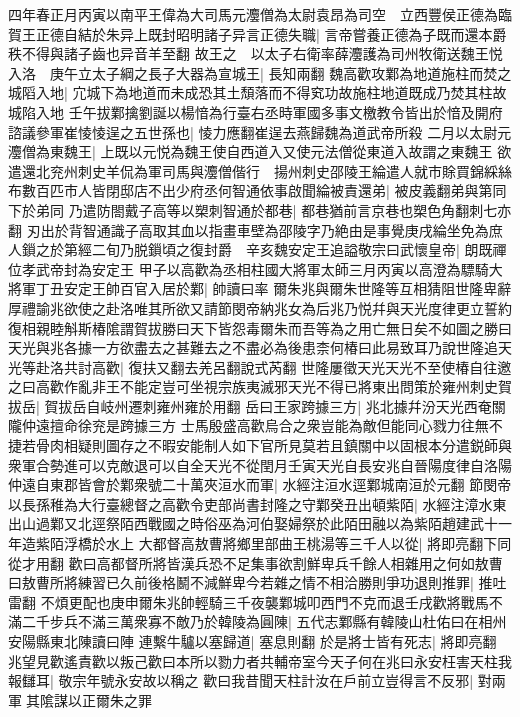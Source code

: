 四年春正月丙寅以南平王偉為大司馬元灋僧為太尉袁昂為司空　立西豐侯正德為臨賀王正德自結於朱异上既封昭明諸子异言正德失職|{
	言帝嘗養正德為子既而還本爵秩不得與諸子齒也异音羊至翻}
故王之　以太子右衛率薛灋護為司州牧衛送魏王悦入洛　庚午立太子綱之長子大器為宣城王|{
	長知兩翻}
魏高歡攻鄴為地道施柱而焚之城䧟入地|{
	宂城下為地道而未成恐其土頹落而不得䆒功故施柱地道既成乃焚其柱故城陷入地}
壬午拔鄴擒劉誕以楊愔為行臺右丞時軍國多事文檄教令皆出於愔及開府諮議參軍崔㥄㥄逞之五世孫也|{
	㥄力應翻崔逞去燕歸魏為道武帝所殺}
二月以太尉元灋僧為東魏王|{
	上既以元悦為魏王使自西道入又使元法僧從東道入故謂之東魏王}
欲遣還北兖州刺史羊侃為軍司馬與灋僧偕行　揚州刺史邵陵王綸遣人就市賖買錦綵絲布數百匹市人皆閉邸店不出少府丞何智通依事啟聞綸被責還弟|{
	被皮義翻弟與第同下於弟同}
乃遣防閤戴子高等以槊刺智通於都巷|{
	都巷猶前言京巷也槊色角翻刺七亦翻}
刃出於背智通識子高取其血以指畫車壁為邵陵字乃絶由是事覺庚戌綸坐免為庶人鎻之於第經二旬乃脱鎻頃之復封爵　辛亥魏安定王追謚敬宗曰武懷皇帝|{
	朗既禪位孝武帝封為安定王}
甲子以高歡為丞相柱國大將軍太師三月丙寅以高澄為驃騎大將軍丁丑安定王帥百官入居於鄴|{
	帥讀曰率}
爾朱兆與爾朱世隆等互相猜阻世隆卑辭厚禮諭兆欲使之赴洛唯其所欲又請節閔帝納兆女為后兆乃悦幷與天光度律更立誓約復相親睦斛斯椿隂謂賀拔勝曰天下皆怨毒爾朱而吾等為之用亡無日矣不如圖之勝曰天光與兆各據一方欲盡去之甚難去之不盡必為後患柰何椿曰此易致耳乃說世隆追天光等赴洛共討高歡|{
	復扶又翻去羌呂翻說式芮翻}
世隆屢徵天光天光不至使椿自往邀之曰高歡作亂非王不能定豈可坐視宗族夷滅邪天光不得已將東出問策於雍州刺史賀拔岳|{
	賀拔岳自岐州遷刺雍州雍於用翻}
岳曰王家跨據三方|{
	兆北據幷汾天光西奄關隴仲遠擅命徐兖是跨據三方}
士馬殷盛高歡烏合之衆豈能為敵但能同心戮力往無不捷若骨肉相疑則圖存之不暇安能制人如下官所見莫若且鎮關中以固根本分遣鋭師與衆軍合勢進可以克敵退可以自全天光不從閏月壬寅天光自長安兆自晉陽度律自洛陽仲遠自東郡皆會於鄴衆號二十萬夾洹水而軍|{
	水經注洹水逕鄴城南洹於元翻}
節閔帝以長孫稚為大行臺總督之高歡令吏部尚書封隆之守鄴癸丑出頓紫陌|{
	水經注漳水東出山過鄴又北逕祭陌西戰國之時俗巫為河伯娶婦祭於此陌田融以為紫陌趙建武十一年造紫陌浮橋於水上}
大都督高敖曹將鄉里部曲王桃湯等三千人以從|{
	將即亮翻下同從才用翻}
歡曰高都督所將皆漢兵恐不足集事欲割鮮卑兵千餘人相雜用之何如敖曹曰敖曹所將練習已久前後格鬭不減鮮卑今若雜之情不相洽勝則爭功退則推罪|{
	推吐雷翻}
不煩更配也庚申爾朱兆帥輕騎三千夜襲鄴城叩西門不克而退壬戌歡將戰馬不滿二千步兵不滿三萬衆寡不敵乃於韓陵為圓陳|{
	五代志鄴縣有韓陵山杜佑曰在相州安陽縣東北陳讀曰陣}
連繫牛驢以塞歸道|{
	塞息則翻}
於是將士皆有死志|{
	將即亮翻}
兆望見歡遙責歡以叛己歡曰本所以勠力者共輔帝室今天子何在兆曰永安枉害天柱我報讎耳|{
	敬宗年號永安故以稱之}
歡曰我昔聞天柱計汝在戶前立豈得言不反邪|{
	對兩軍其隂謀以正爾朱之罪}
